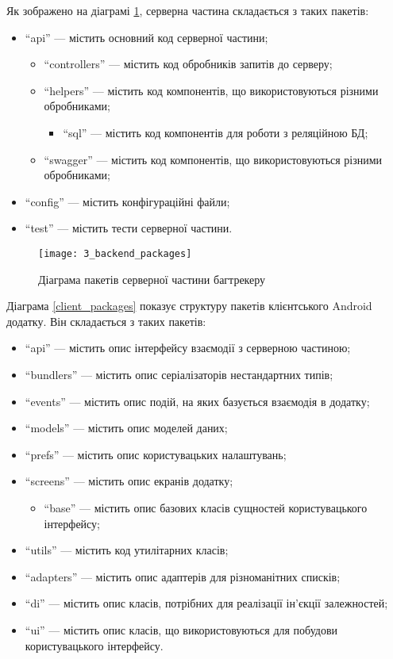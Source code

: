 \documentclass[../main.tex]{subfiles}
\begin{document}
			Як зображено на діаграмі \ref{server_packages}, серверна частина складається з таких пакетів:
			\begin{itemize}
				\item \enquote{api} — містить основний код серверної частини;
				\begin{itemize}
					\item \enquote{controllers} — містить код обробників запитів до серверу;
					\item \enquote{helpers} — містить код компонентів, що використовуються різними обробниками;
					\begin{itemize}
						\item \enquote{sql} — містить код компонентів для роботи з реляційною БД;
					\end{itemize}
					\item \enquote{swagger} — містить код компонентів, що використовуються різними обробниками;
				\end{itemize}
				\item \enquote{config} — містить конфігураційні файли;
				\item \enquote{test} — містить тести серверної частини.
			\end{itemize}
			
			\begin{figure}[H]
				\centering
				\texttt{[image: 3\_backend\_packages]}
				\caption{Діаграма пакетів серверної частини багтрекеру}
				\label{server_packages}
			\end{figure}
			
			
			Діаграма \ref{client_packages} показує структуру пакетів клієнтського Android додатку. Він складається з таких пакетів:
			\begin{itemize}
				\item \enquote{api} — містить опис інтерфейсу взаємодії з серверною частиною;
				\item \enquote{bundlers} — містить опис серіалізаторів нестандартних типів;
				\item \enquote{events} — містить опис подій, на яких базується взаємодія в додатку;
				\item \enquote{models} — містить опис моделей даних;
				\item \enquote{prefs} — містить опис користувацьких налаштувань;
				\item \enquote{screens} — містить опис екранів додатку;
				\begin{itemize}
					\item \enquote{base} — містить опис базових класів сущностей користувацького інтерфейсу;
				\end{itemize}
				\item \enquote{utils} — містить код утилітарних класів;
				\item \enquote{adapters} — містить опис адаптерів для різноманітних списків;
				\item \enquote{di} — містить опис класів, потрібних для реалізації ін'єкції залежностей;
				\item \enquote{ui} — містить опис класів, що використовуються для побудови користувацького інтерфейсу.
			\end{itemize}
			
\end{document}
